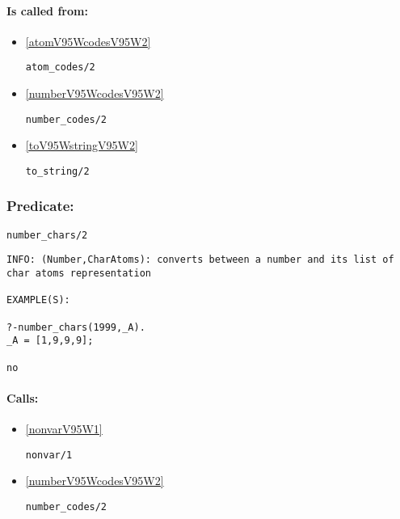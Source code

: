\paragraph{Is called from:} 
\begin{itemize}
\item \ref{atomV95WcodesV95W2} 
\begin{verbatim}
atom_codes/2
\end{verbatim}

\item \ref{numberV95WcodesV95W2} 
\begin{verbatim}
number_codes/2
\end{verbatim}

\item \ref{toV95WstringV95W2} 
\begin{verbatim}
to_string/2
\end{verbatim}

\end{itemize}

\subsubsection{Predicate:} \label{numberV95WcharsV95W2}

\begin{verbatim}
number_chars/2
\end{verbatim}

{\small \begin{verbatim}
INFO: (Number,CharAtoms): converts between a number and its list of char atoms representation

EXAMPLE(S):

?-number_chars(1999,_A).
_A = [1,9,9,9];

no

\end{verbatim}}
\paragraph{Calls:} 
\begin{itemize}
\item \ref{nonvarV95W1} 
\begin{verbatim}
nonvar/1
\end{verbatim}

\item \ref{numberV95WcodesV95W2} 
\begin{verbatim}
number_codes/2
\end{verbatim}

\end{itemize}

